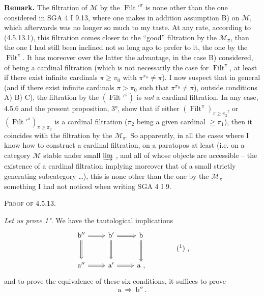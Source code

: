 \documentclass[11pt]{article}
\newcommand{\msp}[1]{\marginpar{\footnotesize [#1]}}
\newcommand{\Filt}{\operatorname{Filt}}
\begin{document}
\textbf{Remark.} The filtration of $\mathcal{M}$ by the $\Filt'^{\pi}$ is none other than the one considered in SGA 4 I 9.13, where one makes in addition assumption B) on $\mathcal{M}$, which afterwards was no longer so much to my taste. At any rate, according to (4.5.13.1), this filtration comes closer to the ``good'' filtration by the $\mathcal{M}_{\pi}$, than the one I had still been inclined not so long ago to prefer to it, the one by the $\Filt^{\pi}$. It has moreover over the latter the advantage, in the case B) considered, of being a cardinal filtration (which is not necessarily the case for $\Filt^{\pi}$, at least if there exist infinite cardinals $\pi \geqslant \pi_0$ with $\pi^{\pi_0} \neq \pi$). I now suspect that in general (and if there exist infinite cardinals $\pi > \pi_0$ such that $\pi^{\pi_0} \neq \pi$), outside conditions A) B) C), the filtration by the $(\Filt'^{\pi})$ is \textit{not} a
\msp{page 128}
cardinal filtration. In any case, 4.5.6 and the present proposition, 3°, show that if either $(\Filt^{\pi})_{\pi\geqslant\pi_2}$, or $(\Filt'^{\pi})_{\pi\geqslant\pi_2}$ is a cardinal filtration ($\pi_2$ being a given cardinal $\geqslant \pi_1$), then it coincides with the filtration by the $\mathcal{M}_{\pi}$. So apparently, in all the cases where I know how to construct a cardinal filtration, on a paratopos at least (i.e. on a category $\mathcal{M}$ stable under small $\varinjlim$ , and all of whose objects are accessible -- the existence of a cardinal filtration implying moreover that of a small strictly generating subcategory \dots), this is none other than the one by the $\mathcal{M}_{\pi}$ -- something I had not noticed when writing SGA 4 I 9. %

\textsc{Proof of 4.5.13.}

\textit{Let us prove 1°.} We have the tautological implications
\[
\begin{tikzcd}[row sep=large]
\mathrm{b}'' \arrow[r, Rightarrow] \arrow[d, Rightarrow] & \mathrm{b}' \arrow[r, Rightarrow] \arrow[d, Rightarrow] & \mathrm{b} \arrow[d, Rightarrow] \\
\mathrm{a}'' \arrow[r, Rightarrow] & \mathrm{a}' \arrow[r, Rightarrow] & \mathrm{a} \text{ ,}
\end{tikzcd}
\qquad\qquad \text{(\footnotemark) ,}
\]
and to prove the equivalence of these six conditions, it suffices to prove
\[ \mathrm{a} \ \Longrightarrow \ \mathrm{b}'' \ . \]
\end{document}
